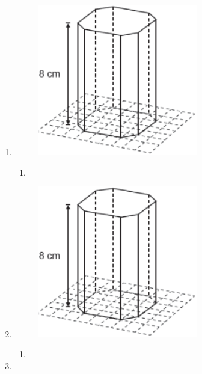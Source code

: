 \documentclass[twocolumn,oneside,a4paper,12.0pt]{article}
\begin{document}
\begin{enumerate}
\item 

	\begin{figure}[!htb]
	\center
	\includegraphics[width=7cm]{Extras/v3.png}
	\end{figure}


\begin{enumerate}
\item 
\end{enumerate}




\item 

	\begin{figure}[!htb]
	\center
	\includegraphics[width=7cm]{Extras/v3.png}
	\end{figure}


\begin{enumerate}
\item 
\end{enumerate}



\item 


\end{enumerate}
\end{document}
